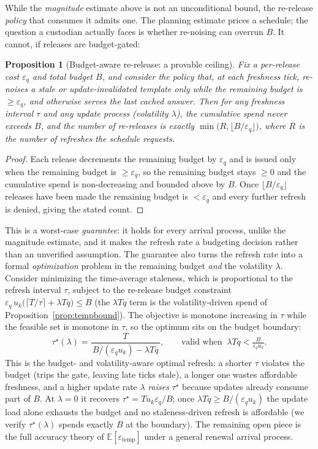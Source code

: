 \documentclass[sigconf,nonacm]{acmart}
\newcommand{\eps}{\varepsilon}
\newcommand{\E}{\mathbb{E}}
\newtheorem{prop}{Proposition}
\begin{document}
While the \emph{magnitude} estimate above is not an unconditional bound, the re-release \emph{policy} that consumes it admits one. The planning estimate prices a schedule; the question a custodian actually faces is whether re-noising can overrun $B$. It cannot, if releases are budget-gated:

\begin{prop}[Budget-aware re-release: a provable ceiling]
\label{prop:barr}
Fix a per-release cost $\eps_q$ and total budget $B$, and consider the policy that, at each freshness tick, re-noises a stale or update-invalidated template only while the remaining budget is $\ge\eps_q$, and otherwise serves the last cached answer. Then for \emph{any} freshness interval $\tau$ and \emph{any} update process (volatility $\lambda$), the cumulative spend never exceeds $B$, and the number of re-releases is exactly $\min\!\bigl(R,\lfloor B/\eps_q\rfloor\bigr)$, where $R$ is the number of refreshes the schedule requests.
\end{prop}
\begin{proof}
Each release decrements the remaining budget by $\eps_q$ and is issued only when the remaining budget is $\ge\eps_q$, so the remaining budget stays $\ge0$ and the cumulative spend is non-decreasing and bounded above by $B$. Once $\lfloor B/\eps_q\rfloor$ releases have been made the remaining budget is $<\eps_q$ and every further refresh is denied, giving the stated count. \end{proof}

\noindent This is a worst-case \emph{guarantee}: it holds for every arrival process, unlike the magnitude estimate, and it makes the refresh rate a budgeting decision rather than an unverified assumption. The guarantee also turns the refresh rate into a formal \emph{optimization} problem in the remaining budget \emph{and} the volatility $\lambda$. Consider minimizing the time-average staleness, which is proportional to the refresh interval $\tau$, subject to the re-release budget constraint $\eps_q\,u_k\bigl(\lceil T/\tau\rceil+\lambda T q\bigr)\le B$ (the $\lambda Tq$ term is the volatility-driven spend of Proposition~\ref{prop:tempbound}). The objective is monotone increasing in $\tau$ while the feasible set is monotone in $\tau$, so the optimum sits on the budget boundary:
\begin{equation*}
\tau^\star(\lambda)=\frac{T}{\,B/(\eps_q u_k)-\lambda T q\,},\qquad\text{valid when }\ \lambda T q<\tfrac{B}{\eps_q u_k}.
\end{equation*}
This is the budget- and volatility-aware optimal refresh: a shorter $\tau$ violates the budget (trips the gate, leaving late ticks stale), a longer one wastes affordable freshness, and a higher update rate $\lambda$ \emph{raises} $\tau^\star$ because updates already consume part of $B$. At $\lambda{=}0$ it recovers $\tau^\star=T u_k\eps_q/B$; once $\lambda T q\ge B/(\eps_q u_k)$ the update load alone exhausts the budget and no staleness-driven refresh is affordable (we verify $\tau^\star(\lambda)$ spends exactly $B$ at the boundary). The remaining open piece is the full accuracy theory of $\E[\eps_{\mathrm{temp}}]$ under a general renewal arrival process.
\end{document}
